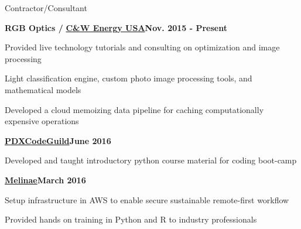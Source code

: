 \documentclass{article}
\newenvironment{**mylist}[2]{
  \subsubsection*{#1\hfill\small#2}
  \small
  \begin{list}{}{}
   \setlength{\topsep}{0pt}
   \setlength{\itemsep}{1pt}
   \setlength{\parskip}{0pt}
   \setlength{\parsep}{0pt}}{\end{list}\normalsize}
\newcommand{\LU}[1]{\hspace{-1em}{\bf Languages Used : #1}}
\begin{document}
\begin{**mylist}{Contractor/Consultant}{}
\item \hspace{-1em}
  {\bf{RGB Optics} / }\href{http://cwenergyusa.com/star-friendly/}{\bf{C\&W Energy USA}}\hfill{\bf{Nov. 2015 - Present}}
\item Provided live technology tutorials and consulting on optimization and image processing
\item Light classification engine, custom photo image processing tools, and mathematical models
\item Developed a cloud memoizing data pipeline for caching computationally expensive operations
\item \hspace{-1em}
  \href{http://pdxcodeguild.com/}{\bf{PDXCodeGuild}}\hfill{\bf{June 2016}}
\item Developed and taught introductory python course material for coding boot-camp
  \pagebreak
\item \hspace{-1em}
  \href{http://www.melinae.com/}{\bf{Melinae}}\hfill{\bf{March 2016}}
\item Setup infrastructure in AWS to enable secure sustainable remote-first workflow
\item Provided hands on training in Python and R to industry professionals
\item \LU{Python, R, AWS, PostgreSQL, Perl, C++}
\end{**mylist}

\begin{comment}
\vspace{2em}
       {\center {\em\footnotesize continued...}\par}
\end{comment}
\end{document}

